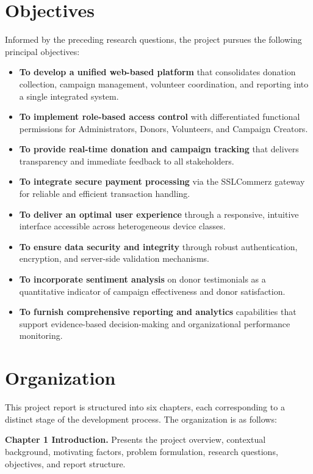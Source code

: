 \documentclass{thesis-library}
\begin{document}
\section{Objectives}
Informed by the preceding research questions, the project pursues the following principal objectives:
\begin{itemize}
    \item \textbf{To develop a unified web-based platform} that consolidates donation collection, campaign management, volunteer coordination, and reporting into a single integrated system.
    \item \textbf{To implement role-based access control} with differentiated functional permissions for Administrators, Donors, Volunteers, and Campaign Creators.
    \item \textbf{To provide real-time donation and campaign tracking} that delivers transparency and immediate feedback to all stakeholders.
    \item \textbf{To integrate secure payment processing} via the SSLCommerz gateway for reliable and efficient transaction handling.
    \item \textbf{To deliver an optimal user experience} through a responsive, intuitive interface accessible across heterogeneous device classes.
    \item \textbf{To ensure data security and integrity} through robust authentication, encryption, and server-side validation mechanisms.
    \item \textbf{To incorporate sentiment analysis} on donor testimonials as a quantitative indicator of campaign effectiveness and donor satisfaction.
    \item \textbf{To furnish comprehensive reporting and analytics} capabilities that support evidence-based decision-making and organizational performance monitoring.
\end{itemize}

\newpage
\section{Organization}

This project report is structured into six chapters, each corresponding to a distinct stage of the development process. The organization is as follows:

\textbf{Chapter 1 Introduction.} Presents the project overview, contextual background, motivating factors, problem formulation, research questions, objectives, and report structure.
\end{document}

